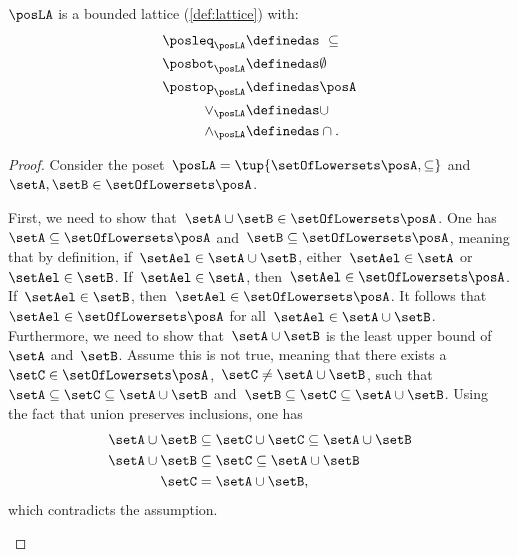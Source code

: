 \begin{lemma}
    $\posLA$ is a bounded lattice (\cref{def:lattice}) with:
    \begin{equation}
        \begin{aligned}
            \posleq_{\posLA}&\definedas \ \subseteq\\
            \posbot_{\posLA}&\definedas \emptyset\\
            \postop_{\posLA}&\definedas \posA\\
            \vee_{\posLA}&\definedas \cup\\
            \wedge_{\posLA}&\definedas \cap.
        \end{aligned}
    \end{equation}
\end{lemma}
\begin{proof}
    Consider the poset~$\posLA=\tup{\setOfLowersets \posA,\subseteq}$ and~$\setA,\setB\in \setOfLowersets \posA$.
    \begin{compactitem}
        \item First, we need to show that~$\setA\cup \setB\in \setOfLowersets \posA$.
        One has~$\setA \subseteq \setOfLowersets \posA$ and~$\setB\subseteq \setOfLowersets \posA$, meaning that by definition, if~$\setAel\in \setA\cup \setB$, either~$\setAel\in \setA$ or~$\setAel\in \setB$.
        If~$\setAel\in \setA$, then~$\setAel\in \setOfLowersets \posA$.
        If~$\setAel\in \setB$, then~$\setAel\in \setOfLowersets \posA$.
        It follows that~$\setAel\in \setOfLowersets \posA$ for all~$\setAel\in \setA\cup \setB$.
        Furthermore, we need to show that~$\setA\cup \setB$ is the least upper bound of~$\setA$ and~$\setB$.
        Assume this is not true, meaning that there exists a~$\setC\in \setOfLowersets \posA$,~$\setC\neq \setA\cup \setB$, such that~$\setA\subseteq \setC\subseteq \setA\cup \setB$ and~$\setB\subseteq \setC\subseteq \setA\cup \setB$.
        Using the fact that union preserves inclusions, one has
        \begin{equation}
            \begin{aligned}
                \setA\cup \setB &\subseteq \setC\cup \setC \subseteq \setA\cup \setB\\
                \setA\cup \setB &\subseteq \setC \subseteq \setA\cup \setB\\
                \setC&= \setA\cup \setB,
            \end{aligned}
        \end{equation}
        which contradicts the assumption.

\end{compactitem}
\end{proof}
